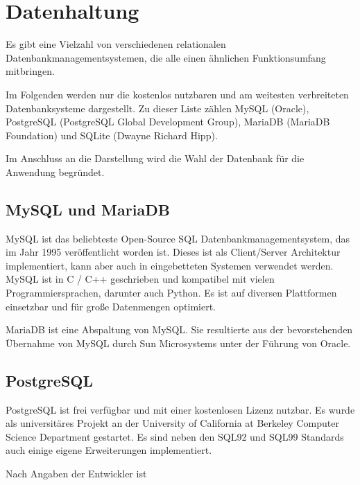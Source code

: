 \section{Datenhaltung} \label{sec:Datenhaltung}
Es gibt eine Vielzahl von verschiedenen relationalen Datenbankmanagementsystemen, die alle einen ähnlichen Funktionsumfang mitbringen.

Im Folgenden werden nur die kostenlos nutzbaren und am weitesten verbreiteten Datenbanksysteme dargestellt. Zu dieser Liste zählen MySQL (Oracle), PostgreSQL (PostgreSQL Global Development Group), MariaDB (MariaDB Foundation) und SQLite (Dwayne Richard Hipp). \cite{db-enginesDBEnginesRanking}

Im Anschluss an die Darstellung wird die Wahl der Datenbank für die Anwendung \linebreak begründet.

\subsection{MySQL und MariaDB}
MySQL ist das beliebteste Open-Source SQL Datenbankmanagementsystem, das im Jahr 1995 veröffentlicht worden ist. Dieses ist als Client/Server Architektur implementiert, kann aber auch in eingebetteten Systemen verwendet werden. \cite{oraclecorporationMySQLMySQLReference2020} MySQL ist in C / C++ geschrieben und kompatibel mit vielen Programmiersprachen, darunter auch Python. Es ist auf diversen Plattformen einsetzbar und für große Datenmengen optimiert. \cite{oraclecorporationMySQLMySQLReference2020a}

MariaDB ist eine Abspaltung von MySQL. Sie resultierte aus der bevorstehenden Übernahme von MySQL durch Sun Microsystems unter der Führung von Oracle. \cite{ionosMariaDBVsMySQL2020}

\subsection{PostgreSQL}
PostgreSQL ist frei verfügbar und mit einer kostenlosen Lizenz nutzbar. Es wurde als universitäres Projekt an der University of California at Berkeley Computer Science Department gestartet. Es sind neben den SQL92 und SQL99 Standards auch einige eigene Erweiterungen implementiert. \cite{boenigkWasIstPostgreSQL} 

Nach Angaben der Entwickler ist  

